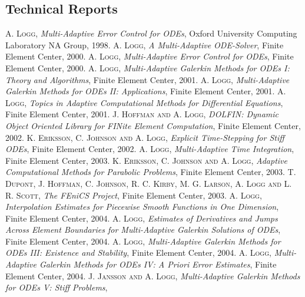 \begin{thebibliography}{99}
\subsection*{Technical Reports}
 {\textsc{A. Logg},
\textit{Multi-Adaptive Error Control for {ODE}s},
Oxford University Computing Laboratory NA Group,
1998.
}
 {\textsc{A. Logg},
\textit{A Multi-Adaptive {ODE}-Solver},
Finite Element Center,
2000.
}
 {\textsc{A. Logg},
\textit{Multi-Adaptive Error Control for {ODE}s},
Finite Element Center,
2000.
}
 {\textsc{A. Logg},
\textit{Multi-Adaptive {G}alerkin Methods for {ODE}s {I}: {T}heory and Algorithms},
Finite Element Center,
2001.
}
 {\textsc{A. Logg},
\textit{Multi-Adaptive {G}alerkin Methods for {ODE}s {II}: {A}pplications},
Finite Element Center,
2001.
}
 {\textsc{A. Logg},
\textit{Topics in Adaptive Computational Methods for Differential Equations},
Finite Element Center,
2001.
}
 {\textsc{J. Hoffman and A. Logg},
\textit{{DOLFIN}: {D}ynamic {O}bject Oriented {L}ibrary for {FIN}ite Element Computation},
Finite Element Center,
2002.
}
 {\textsc{K. Eriksson, C. Johnson and A. Logg},
\textit{Explicit Time-Stepping for Stiff {ODE}s},
Finite Element Center,
2002.
}
 {\textsc{A. Logg},
\textit{Multi-Adaptive Time Integration},
Finite Element Center,
2003.
}
 {\textsc{K. Eriksson, C. Johnson and A. Logg},
\textit{Adaptive Computational Methods for Parabolic Problems},
Finite Element Center,
2003.
}
 {\textsc{T. Dupont, J. Hoffman, C. Johnson, R. C. Kirby, M. G. Larson, A. Logg and L. R. Scott},
\textit{The {FE}ni{CS} Project},
Finite Element Center,
2003.
}
 {\textsc{A. Logg},
\textit{Interpolation Estimates for Piecewise Smooth Functions in One Dimension},
Finite Element Center,
2004.
}
 {\textsc{A. Logg},
\textit{Estimates of Derivatives and Jumps Across Element Boundaries for Multi-Adaptive {G}alerkin Solutions of {ODE}s},
Finite Element Center,
2004.
}
 {\textsc{A. Logg},
\textit{Multi-Adaptive {G}alerkin Methods for {ODE}s {III}: {E}xistence and Stability},
Finite Element Center,
2004.
}
 {\textsc{A. Logg},
\textit{Multi-Adaptive {G}alerkin Methods for {ODE}s {IV}: {A} Priori Error Estimates},
Finite Element Center,
2004.
}
 {\textsc{J. Jansson and A. Logg},
\textit{Multi-Adaptive {G}alerkin Methods for {ODE}s {V}: {S}tiff Problems},
}
\end{thebibliography}
